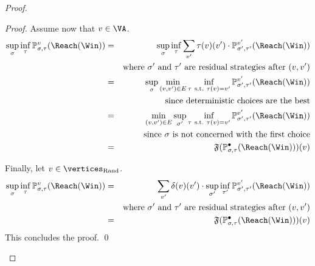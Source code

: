 \begin{proof}
\begin{proof}
    Assume now that $v \in \VA$. 
    \begin{eqnarray*}
      \sup_\sigma \inf_\tau \probm_{\sigma,\tau}^v(\Reach(\Win)) & = &
      \sup_\sigma \inf_\tau \sum_{v'} \tau(v)(v')
      \cdot \probm_{\sigma',\tau'}^{v'}(\Reach(\Win)) \\
      & & \text{where}\ \sigma'\ \text{and}\ \tau'\ \text{are residual
        strategies after}\ (v,v') \\
      & = & \sup_\sigma \min_{(v,v') \in E} \inf_{\tau\
        \text{s.t.}\ \tau(v) = v'} 
       \probm_{\sigma',\tau'}^{v'}(\Reach(\Win)) \\
      & & \text{since deterministic choices are the best} \\
      & = & \min_{(v,v') \in E}  \sup_{\sigma'} \inf_{\tau\
        \text{s.t.}\ \tau(v) = v'} \probm_{\sigma',\tau'}^{v'}(\Reach(\Win)) \\
      & & \text{since}\ \sigma\ \text{is not concerned with the first
        choice} \\
      & = & \mathfrak{F}(\probm_{\sigma,\tau}^{\bullet}(\Reach(\Win)))(v)
    \end{eqnarray*}

    Finally, let  $v \in \Randomvertices$. 
    \begin{eqnarray*}
      \sup_\sigma \inf_\tau \probm_{\sigma,\tau}^v(\Reach(\Win)) & = & \sum_{v'} \delta(v)(v') \cdot \sup_{\sigma'} \inf_{\tau'} \probm_{\sigma',\tau'}^{v'}(\Reach(\Win))\\
            & & \text{where}\ \sigma'\ \text{and}\ \tau'\ \text{are residual
                strategies after}\ (v,v') \\
      & = & \mathfrak{F}(\probm_{\sigma,\tau}^{\bullet}(\Reach(\Win)))(v)
    \end{eqnarray*}
    This concludes the proof.
%
    \qed
  \end{proof}


\end{proof}
